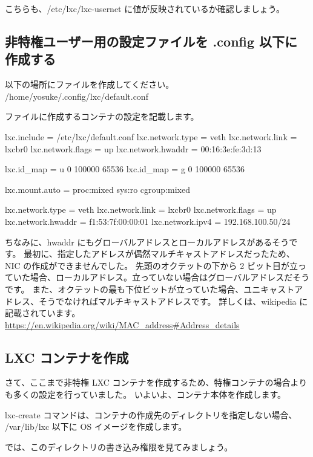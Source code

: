 \documentclass[mingoth,a4paper]{jsarticle}
\begin{document}

こちらも、/etc/lxc/lxc-usernet に値が反映されているか確認しましょう。

\subsection{非特権ユーザー用の設定ファイルを .config 以下に作成する}

以下の場所にファイルを作成してください。
/home/yosuke/.config/lxc/default.conf

ファイルに作成するコンテナの設定を記載します。
\begin{commandline}
lxc.include = /etc/lxc/default.conf
lxc.network.type = veth
lxc.network.link = lxcbr0
lxc.network.flags = up
lxc.network.hwaddr = 00:16:3e:fe:3d:13

lxc.id_map = u 0 100000 65536
lxc.id_map = g 0 100000 65536

lxc.mount.auto = proc:mixed sys:ro cgroup:mixed

lxc.network.type = veth
lxc.network.link = lxcbr0
lxc.network.flags = up
lxc.network.hwaddr = f1:53:7f:00:00:01
lxc.network.ipv4 = 192.168.100.50/24
\end{commandline}

ちなみに、hwaddr にもグローバルアドレスとローカルアドレスがあるそうです。
最初に、指定したアドレスが偶然マルチキャストアドレスだったため、NIC の作成ができませんでした。
先頭のオクテットの下から 2 ビット目が立っていた場合、ローカルアドレス。立っていない場合はグローバルアドレスだそうです。
また、オクテットの最も下位ビットが立っていた場合、ユニキャストアドレス、そうでなければマルチキャストアドレスです。
詳しくは、wikipedia に記載されています。
\url{https://en.wikipedia.org/wiki/MAC_address#Address_details}

\subsection{LXC コンテナを作成}

さて、ここまで非特権 LXC コンテナを作成するため、特権コンテナの場合よりも多くの設定を行っていました。
いよいよ、コンテナ本体を作成します。

lxc-create コマンドは、コンテナの作成先のディレクトリを指定しない場合、
/var/lib/lxc 以下に OS イメージを作成します。

では、このディレクトリの書き込み権限を見てみましょう。
\end{document}
